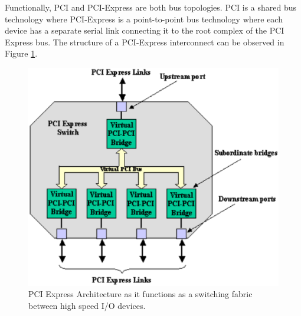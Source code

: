 \documentclass[conference]{IEEEtran}
\begin{document}
Functionally, PCI and PCI-Express are both bus topologies. PCI is a shared bus
technology where PCI-Express is a point-to-point bus technology where each
device has a separate serial link connecting it to the root complex of the PCI
Express bus.\cite{budruk2004pci} The structure of a PCI-Express interconnect can
be observed in Figure \ref{fig:pci:diagram}.

\begin{figure}[!t]
	\begin{center}
		\includegraphics[scale=.4]{pciDiagram}
	\end{center}
	\caption{PCI Express Architecture as it functions as a switching fabric
	between high speed I/O devices.\cite{mayhew2003pci}}
	\label{fig:pci:diagram}
\end{figure}
\end{document}
